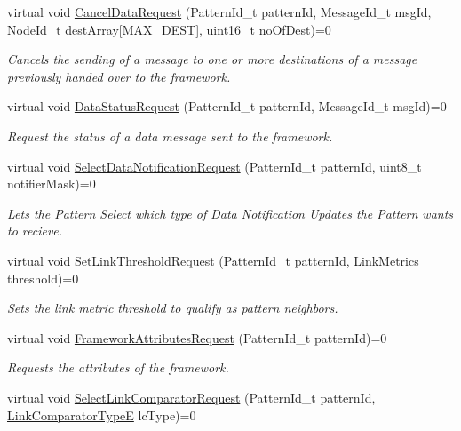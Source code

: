 \begin{DoxyCompactItemize}
\item 
virtual void \hyperlink{class_p_w_i_1_1_framework___i_a018a8d6a757ff5925f514c44e21d21d1}{Cancel\+Data\+Request} (Pattern\+Id\+\_\+t pattern\+Id, Message\+Id\+\_\+t msg\+Id, Node\+Id\+\_\+t dest\+Array\mbox{[}M\+A\+X\+\_\+\+D\+E\+ST\mbox{]}, uint16\+\_\+t no\+Of\+Dest)=0
\begin{DoxyCompactList}\small\item\em Cancels the sending of a message to one or more destinations of a message previously handed over to the framework. \end{DoxyCompactList}\item 
virtual void \hyperlink{class_p_w_i_1_1_framework___i_a06e0bc143aa0009aec23dbe3c4ba26db}{Data\+Status\+Request} (Pattern\+Id\+\_\+t pattern\+Id, Message\+Id\+\_\+t msg\+Id)=0
\begin{DoxyCompactList}\small\item\em Request the status of a data message sent to the framework. \end{DoxyCompactList}\item 
virtual void \hyperlink{class_p_w_i_1_1_framework___i_af785062dc2e35cf4e7e0b83d90b6a861}{Select\+Data\+Notification\+Request} (Pattern\+Id\+\_\+t pattern\+Id, uint8\+\_\+t notifier\+Mask)=0
\begin{DoxyCompactList}\small\item\em Lets the Pattern Select which type of Data Notification Updates the Pattern wants to recieve. \end{DoxyCompactList}\item 
virtual void \hyperlink{class_p_w_i_1_1_framework___i_a21e4ba232772b54f21590ee01f0d46e9}{Set\+Link\+Threshold\+Request} (Pattern\+Id\+\_\+t pattern\+Id, \hyperlink{struct_core_1_1_link_metrics}{Link\+Metrics} threshold)=0
\begin{DoxyCompactList}\small\item\em Sets the link metric threshold to qualify as pattern neighbors. \end{DoxyCompactList}\item 
virtual void \hyperlink{class_p_w_i_1_1_framework___i_a0193172e5b9d95ac97183979a0a32a0d}{Framework\+Attributes\+Request} (Pattern\+Id\+\_\+t pattern\+Id)=0
\begin{DoxyCompactList}\small\item\em Requests the attributes of the framework. \end{DoxyCompactList}\item 
virtual void \hyperlink{class_p_w_i_1_1_framework___i_abb057c8987930daade5b990eed829d6e}{Select\+Link\+Comparator\+Request} (Pattern\+Id\+\_\+t pattern\+Id, \hyperlink{namespace_p_w_i_1_1_neighborhood_a54f3d64f52739fa54193660451fd8a6f}{Link\+Comparator\+TypeE} lc\+Type)=0

\end{DoxyCompactItemize}
